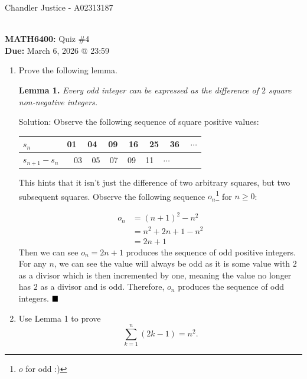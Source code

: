 \documentclass[10pt]{article}
\newcommand{\solution}{\color{blue} Solution: \color{black}}
\begin{document}
\begin{flushright}
Chandler Justice - A02313187
\end{flushright}
\noindent \underline{\hspace{3in}}\\
\textbf{MATH6400:} Quiz \#4\\
\textbf{Due:} March 6, 2026 @ 23:59\\

	\begin{enumerate}
		\item Prove the following lemma.
		
            {\bf Lemma 1.} \emph{Every odd integer can be expressed as the difference of $2$ square  \textit{non-negative} integers.}
	
        \solution Observe the following sequence of square positive values:
        
        \begin{center}
            \begin{tabular}{|l|l|}
            $s_n$ & 01 ~ 04 ~ 09 ~ 16 ~ 25 ~ 36 ~ $\cdots$\\
            \hline
            $s_{n + 1} - s_n$ & ~ 03 ~ 05 ~ 07 ~ 09 ~ 11 ~ $\cdots$
            \end{tabular}
        \end{center}
        
        This hints that it isn't just the difference of two arbitrary squares, but two subsequent squares. Observe the following sequence $o_n$\footnote{$o$ for odd :)} for $n \geq 0$:

        \begin{align*}
            o_n &= (n + 1)^2 - n^2\\
                &= n^2 + 2n + 1 - n^2\\
                &= 2n + 1
        \end{align*}
        Then we can see $o_n = 2n + 1$ produces the sequence of odd positive integers. For any $n$, we can see the value will always be odd as it is some value with $2$ as a divisor which is then incremented by one, meaning the value no longer has $2$ as a divisor and is odd. Therefore, $o_n$ produces the sequence of odd integers. $\hfill\blacksquare$\\

		\item Use Lemma 1 to prove $$\sum_{k=1}^n (2k-1) = n^2.$$
		

\end{enumerate}
\end{document}
